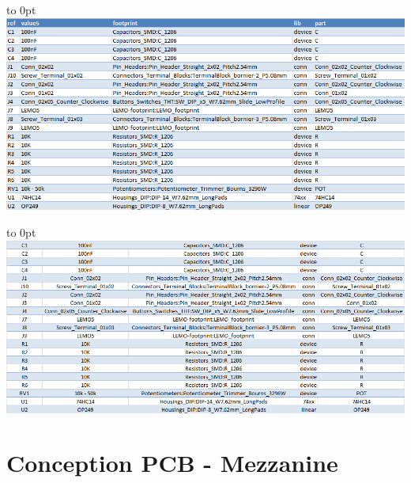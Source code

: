 \documentclass[french,a4paper,12pt]{report}
\begin{document}
		\hfill\hbox to 0pt{\hss\includegraphics[width=15cm]{AOP_Liste_Compos.png}\hss}\hfill\null\newline
		
		\hfill\hbox to 0pt{\hss\includegraphics[width=15cm]{AOP_ListeComposants.png}\hss}\hfill\null\newline
		
	\chapter{Conception PCB - Mezzanine}
		
			
		
		
		
			
\end{document}
